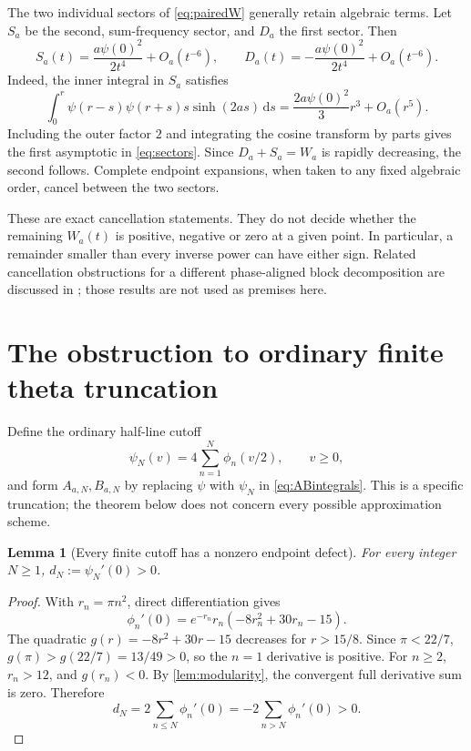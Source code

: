 \documentclass[11pt,letterpaper]{article}
\numberwithin{equation}{section}
\newtheorem{lemma}[theorem]{Lemma}
\theoremstyle{definition}
\theoremstyle{remark}
\newcommand{\dd}{\,\mathrm d}
\begin{document}
The two individual sectors of \eqref{eq:pairedW} generally retain algebraic terms. Let $S_a$ be the second, sum-frequency sector, and $D_a$ the first sector. Then
\begin{equation}\label{eq:sectors}
S_a(t)=\frac{a\psi(0)^2}{2t^4}+O_a(t^{-6}),\qquad
D_a(t)=-\frac{a\psi(0)^2}{2t^4}+O_a(t^{-6}).
\end{equation}
Indeed, the inner integral in $S_a$ satisfies
\[
\int_0^r\psi(r-s)\psi(r+s)s\sinh(2as)\dd s
=\frac{2a\psi(0)^2}{3}r^3+O_a(r^5).
\]
Including the outer factor $2$ and integrating the cosine transform by parts gives the first asymptotic in \eqref{eq:sectors}. Since $D_a+S_a=W_a$ is rapidly decreasing, the second follows. Complete endpoint expansions, when taken to any fixed algebraic order, cancel between the two sectors.

These are exact cancellation statements. They do not decide whether the remaining $W_a(t)$ is positive, negative or zero at a given point. In particular, a remainder smaller than every inverse power can have either sign. Related cancellation obstructions for a different phase-aligned block decomposition are discussed in \cite{planat,planatCompanion}; those results are not used as premises here.

\section{The obstruction to ordinary finite theta truncation}
Define the ordinary half-line cutoff
\begin{equation}\label{eq:psiN}
\psi_N(v)=4\sum_{n=1}^N\phi_n(v/2),\qquad v\ge0,
\end{equation}
and form $A_{a,N},B_{a,N}$ by replacing $\psi$ with $\psi_N$ in \eqref{eq:ABintegrals}. This is a specific truncation; the theorem below does not concern every possible approximation scheme.

\begin{lemma}[Every finite cutoff has a nonzero endpoint defect]\label{lem:dN}
For every integer $N\ge1$, $d_N:=\psi_N'(0)>0$.
\end{lemma}
\begin{proof}
With $r_n=\pi n^2$, direct differentiation gives
\begin{equation}\label{eq:phiDerivative}
\phi_n'(0)=e^{-r_n}r_n(-8r_n^2+30r_n-15).
\end{equation}
The quadratic $g(r)=-8r^2+30r-15$ decreases for $r>15/8$. Since $\pi<22/7$, $g(\pi)>g(22/7)=13/49>0$, so the $n=1$ derivative is positive. For $n\ge2$, $r_n>12$, and $g(r_n)<0$. By \cref{lem:modularity}, the convergent full derivative sum is zero. Therefore
\begin{equation}\label{eq:dN}
d_N=2\sum_{n\le N}\phi_n'(0)
=-2\sum_{n>N}\phi_n'(0)>0.
\end{equation}
\end{proof}
\end{document}
